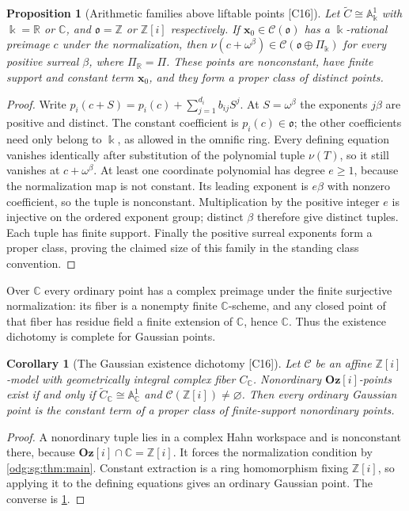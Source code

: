 \documentclass[11pt,oneside]{article}
\numberwithin{equation}{section}
\newtheorem{proposition}[proposition]{Proposition}
\newtheorem{corollary}[corollary]{Corollary}
\theoremstyle{definition}
\theoremstyle{remark}
\newcommand{\Oz}{\mathbf{Oz}}
\newcommand{\Z}{\mathbb Z}
\newcommand{\R}{\mathbb R}
\newcommand{\C}{\mathbb C}
\newcommand{\src}[1]{\textup{\textsf{\small[#1]}}}
\newcommand{\Og}{\Oz[i]}
\newcommand{\Aff}{\mathbb A}
\begin{document}
\begin{proposition}[Arithmetic families above liftable points \src{C16}]\label{odg:sg:prop:arithfamily}
Let $\widetilde C\cong\Aff^1_\Bbbk$ with $\Bbbk=\R$ or $\C$, and $\mathfrak o=\Z$ or $\Z[i]$
respectively. If $\mathbf x_0\in\mathcal C(\mathfrak o)$ has a $\Bbbk$-rational preimage $c$
under the normalization, then $\nu(c+\omega^\beta)\in\mathcal C(\mathfrak o\oplus\Pi_\Bbbk)$
for every positive surreal $\beta$, where $\Pi_\R=\Pi$. These points are nonconstant, have
finite support and constant term $\mathbf x_0$, and they form a proper class of distinct
points.
\end{proposition}
\begin{proof}
Write $p_i(c+S)=p_i(c)+\sum_{j=1}^{d_i}b_{ij}S^j$.
At $S=\omega^\beta$ the exponents $j\beta$ are positive and distinct.
The constant coefficient is $p_i(c)\in\mathfrak o$; the other coefficients
need only belong to $\Bbbk$, as allowed in the omnific ring. Every defining
equation vanishes identically after substitution of the polynomial tuple
$\nu(T)$, so it still vanishes at $c+\omega^\beta$.
At least one coordinate polynomial has degree $e\ge1$, because the
normalization map is not constant. Its leading exponent is $e\beta$ with
nonzero coefficient, so the tuple is nonconstant. Multiplication by the
positive integer $e$ is injective on the ordered exponent group; distinct
$\beta$ therefore give distinct tuples. Each tuple has finite support.
Finally the positive surreal exponents form a proper class, proving the
claimed size of this family in the standing class convention.
\end{proof}

Over $\C$ every ordinary point has a complex preimage under the finite surjective
normalization: its fiber is a nonempty finite $\C$-scheme, and any closed
point of that fiber has residue field a finite extension of $\C$, hence $\C$.
Thus the existence dichotomy is complete for Gaussian points.

\begin{corollary}[The Gaussian existence dichotomy \src{C16}]\label{odg:sg:cor:gaussian}
Let $\mathcal C$ be an affine $\Z[i]$-model with geometrically integral complex fiber $C_\C$.
Nonordinary $\Og$-points exist if and only if $\widetilde C_\C\cong\Aff^1_\C$ and
$\mathcal C(\Z[i])\ne\varnothing$. Then every ordinary Gaussian point is the constant term of
a proper class of finite-support nonordinary points.
\end{corollary}
\begin{proof}
A nonordinary tuple lies in a complex Hahn workspace and is nonconstant
there, because $\Og\cap\C=\Z[i]$. It forces the normalization condition by
\cref{odg:sg:thm:main}. Constant extraction is a ring homomorphism fixing
$\Z[i]$, so applying it to the defining equations gives an ordinary
Gaussian point. The converse is
\cref{odg:sg:prop:arithfamily}.
\end{proof}
\end{document}
